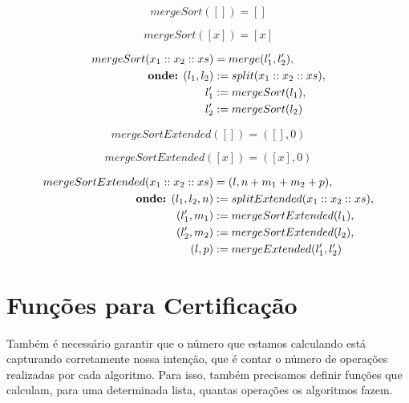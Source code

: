 \documentclass[12pt, oneside, a4paper,english,brazil]{abntex2}
\begin{document}
\begin{equation}\label{ms_1}
mergeSort([]) = []
\end{equation}

\begin{equation}\label{ms_2}
mergeSort([x]) = [x]
\end{equation}

\begin{equation}\label{ms_3}
\begin{split}
  mergeSort(x_{1} :: x_{2} :: xs) &= merge(l_{1}', l_{2}'),\\
  \text{\textbf{onde:} } (l_{1}, l_{2}) &:= split(x_{1} :: x_{2} :: xs),\\
  l_{1}' &:= mergeSort(l_{1}),\\
  l_{2}' &:= mergeSort(l_{2})
\end{split}
\end{equation}

\begin{equation}\label{ms_ext_1}
mergeSortExtended([]) = ([], 0)
\end{equation}

\begin{equation}\label{ms_ext_2}
mergeSortExtended([x]) = ([x], 0)
\end{equation}

\begin{equation}\label{ms_ext_3}
\begin{split}
  mergeSortExtended(x_{1} :: x_{2} :: xs) &= (l, n + m_{1} + m_{2} + p),\\
  \text{\textbf{onde:} } (l_{1}, l_{2}, n) &:= splitExtended(x_{1} :: x_{2} :: xs),\\
  (l_{1}', m_{1}) &:= mergeSortExtended(l_{1}),\\
  (l_{2}', m_{2}) &:= mergeSortExtended(l_{2}),\\
  (l, p) &:= mergeExtended(l_{1}', l_{2}')
\end{split}
\end{equation}

\section{Fun\c{c}\~oes para Certifica\c{c}\~ao}

\qquad Tamb\'em \'e necess\'ario garantir que o n\'umero que estamos calculando
est\'a capturando corretamente nossa inten\c{c}\~ao, que \'e contar o n\'umero
de opera\c{c}\~oes realizadas por cada algoritmo.  Para isso, tamb\'em
precisamos definir fun\c{c}\~oes que calculam, para uma determinada lista,
quantas opera\c{c}\~oes os algoritmos fazem.
\end{document}
